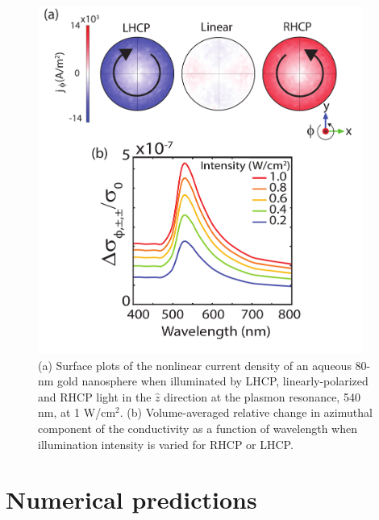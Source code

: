 \begin{figure}[b!]
\centering
\includegraphics[width=0.95\textwidth]{SigandJPhi8}
\caption{(a) Surface plots of the nonlinear current density of an aqueous 80-nm gold nanosphere when illuminated by LHCP, linearly-polarized and RHCP light in the $\hat{z}$ direction at the plasmon resonance, 540 nm, at 1 W/cm$^2$. (b) Volume-averaged relative change in azimuthal component of the conductivity as a function of wavelength when illumination intensity is varied for RHCP or LHCP.}
\label{fig:2}
\end{figure}
\section{Numerical predictions}

